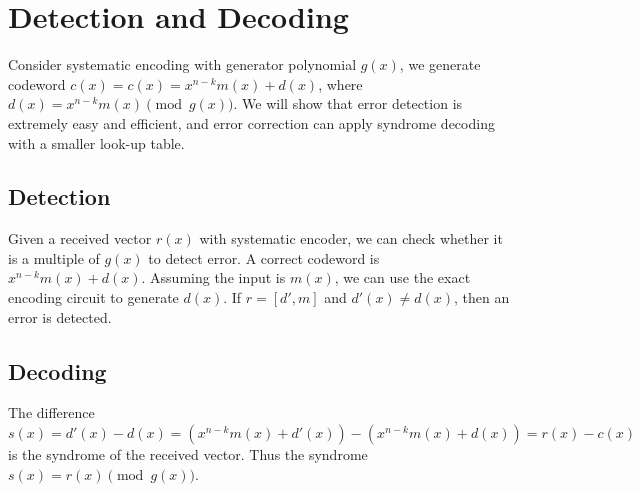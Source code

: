 \section{Detection and Decoding}
Consider systematic encoding with generator polynomial \(g(x)\), we generate codeword \(c(x) = c(x)=x^{n-k}m(x) + d(x)\), where \(d(x) = x^{n-k}m(x) \pmod{g(x)} \). We will show that error detection is extremely easy and efficient, and error correction can apply syndrome decoding with a smaller look-up table. 

\subsection{Detection}
Given a received vector \(r(x)\) with systematic encoder, we can check whether it is a multiple of \(g(x)\) to detect error. A correct codeword is \(x^{n-k}m(x) + d(x)\). Assuming the input is \(m(x)\), we can use the exact encoding circuit to generate \(d(x)\). If \(r = [d', m]\) and \(d'(x) \neq d(x)\), then an error is detected.

\subsection{Decoding}
The difference \(s(x) = d'(x) - d(x) = (x^{n-k}m(x) + d'(x)) - (x^{n-k}m(x) + d(x)) = r(x) - c(x)\) is the syndrome of the received vector. Thus the syndrome \(s(x) = r(x) \pmod{g(x)}\).
